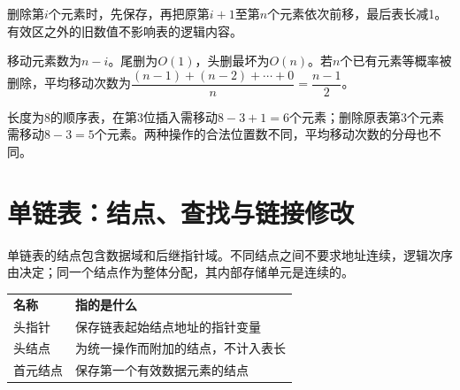 删除第$i$个元素时，先保存，再把原第$i+1$至第$n$个元素依次前移，最后表长减1。有效区之外的旧数值不影响表的逻辑内容。


\hypertarget{ds2-sq-delete}{}

\Needspace{124.8pt}

\hypertarget{ds2-delete-count}{}

移动元素数为$n-i$。尾删为$O(1)$，头删最坏为$O(n)$。若$n$个已有元素等概率被删除，平均移动次数为$\dfrac{(n-1)+(n-2)+\cdots+0}{n}=\dfrac{n-1}{2}$。


\hypertarget{ds2-moves-example}{}

\begin{example}
长度为8的顺序表，在第3位插入需移动$8-3+1=6$个元素；删除原表第3个元素需移动$8-3=5$个元素。两种操作的合法位置数不同，平均移动次数的分母也不同。
\end{example}

\hypertarget{ds2-linked}{}

\section{单链表：结点、查找与链接修改}\label{ds2-linked}

\hypertarget{ds2-node-def}{}

单链表的结点包含数据域和后继指针域。不同结点之间不要求地址连续，逻辑次序由决定；同一个结点作为整体分配，其内部存储单元是连续的。


\hypertarget{ds2-node-struct}{}

\Needspace{105.6pt}

\hypertarget{ds2-head-figure}{}


\hypertarget{ds2-head-terms}{}

\par\smallskip\noindent\begin{tabularx}{\linewidth}{@{}YY@{}}\toprule
{} \textbf{名称} & \textbf{指的是什么} \\
头指针 & 保存链表起始结点地址的指针变量 \\
头结点 & 为统一操作而附加的结点，不计入表长 \\
首元结点 & 保存第一个有效数据元素的结点 \\\bottomrule\end{tabularx}\par\smallskip

